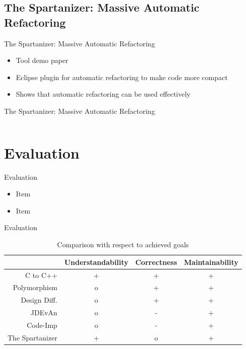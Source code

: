 \documentclass{beamer}
\begin{document}
\subsection{The Spartanizer: Massive Automatic Refactoring}

\begin{frame}{The Spartanizer: Massive Automatic Refactoring}
  \begin{itemize}
    \item Tool demo paper
    \item Eclipse plugin for automatic refactoring to make code more compact
    \pause
    \item Shows that automatic refactoring can be used effectively
  \end{itemize}
\end{frame}

\begin{frame}[fragile]{The Spartanizer: Massive Automatic Refactoring}
  \begin{columns}[T]
    \begin{column}{.49\textwidth}
      
    \end{column}
    \begin{column}{.5\textwidth}
      
    \end{column}
  \end{columns}
\end{frame}

\section{Evaluation}

\begin{frame}{Evaluation} 
  \begin{itemize}
    \item Item
    \item Item
  \end{itemize}
\end{frame}

\begin{frame}{Evaluation} 
  \begin{table}[htb]
    \centering
    \caption{Comparison with respect to achieved goals}
    \label{tbl:goals}
    \begin{tabular}{r|ccc}
      ~               & Understandability & Correctness & Maintainability \\ \hline
      C to C++        & +                 & +           & + \\
      Polymorphism    & o                 & +           & + \\
      Design Diff.    & o                 & +           & + \\
      JDEvAn          & o                 & -           & + \\
      Code-Imp        & o                 & -           & + \\
      The Spartanizer & +                 & o           & + \\
    \end{tabular}
  \end{table}
\end{frame}
\end{document}
